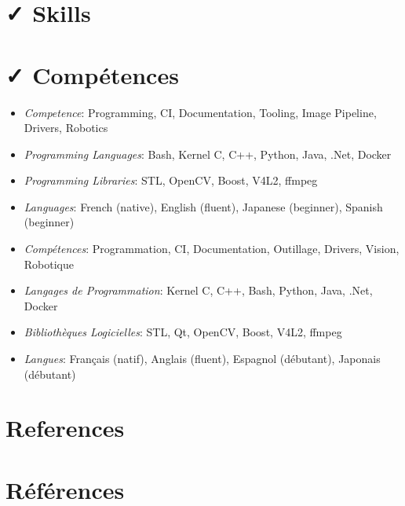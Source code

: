 \documentclass{resume}
\begin{document}
 {
  \section{{\faCheck} Skills}
} {
  \section{{\faCheck} Comp\'{e}tences}
}

 {
  \begin{itemize}
    \item {\em Competence}: Programming, CI, Documentation, Tooling, Image Pipeline, Drivers, Robotics \\
    \item {\em Programming Languages}: Bash, Kernel C, C++, Python, Java, .Net, Docker \\
    \item {\em Programming Libraries}: STL, OpenCV, Boost, V4L2, ffmpeg \\
    \item {\em Languages}: French (native), English (fluent), Japanese (beginner), Spanish (beginner) \\
  \end{itemize}
} {
  \begin{itemize}
    \item {\em Comp\'{e}tences}: Programmation, CI, Documentation, Outillage, Drivers, Vision, Robotique \\
    \item {\em Langages de Programmation}: Kernel C, C++, Bash, Python, Java, .Net, Docker \\
    \item {\em Biblioth\`{e}ques Logicielles}: STL, Qt, OpenCV, Boost, V4L2, ffmpeg \\
    \item {\em Langues}: Fran\c{c}ais (natif), Anglais (fluent), Espagnol (d\'{e}butant), Japonais (d\'{e}butant) \\
  \end{itemize}
}

 {
  \section{{\faAddressBook} References}
} {
  \section{{\faAddressBook} R\'{e}f\'{e}rences}
}
\end{document}
